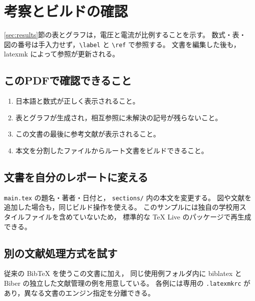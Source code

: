\section{考察とビルドの確認}
\ref{sec:results}節の表とグラフは，電圧と電流が比例することを示す。
数式・表・図の番号は手入力せず，\verb|\label| と \verb|\ref| で参照する。
文書を編集した後も，latexmk によって参照が更新される。

\subsection{このPDFで確認できること}
\begin{enumerate}
  \item 日本語と数式が正しく表示されること。
  \item 表とグラフが生成され，相互参照に未解決の記号が残らないこと。
  \item この文書の最後に参考文献が表示されること。
  \item 本文を分割したファイルからルート文書をビルドできること。
\end{enumerate}

\subsection{文書を自分のレポートに変える}
\texttt{main.tex} の題名・著者・日付と，
\texttt{sections/} 内の本文を変更する。
図や文献を追加した場合も，同じビルド操作を使える。
このサンプルには独自の学校用スタイルファイルを含めていないため，
標準的な TeX Live のパッケージで再生成できる。

\subsection{別の文献処理方式を試す}
従来の BibTeX を使うこの文書に加え，
同じ使用例フォルダ内に biblatex と Biber の独立した文献管理の例を用意している。
各例には専用の \texttt{.latexmkrc} があり，異なる文書のエンジン指定を分離できる。
